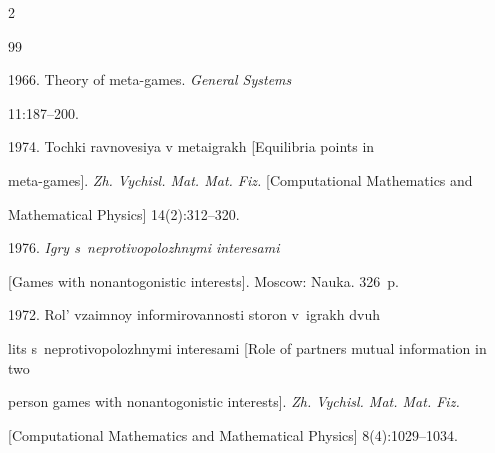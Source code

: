








  \begin{multicols}{2}



\renewcommand{\bibname}{\protect\rmfamily References}








{\small\frenchspacing

 {%


 \begin{thebibliography}{99}








 1966. Theory of meta-games. \textit{General Systems}

11:187--200.


 1974. Tochki ravnovesiya v metaigrakh [Equilibria points in

meta-games]. \textit{Zh. Vychisl. Mat. Mat. Fiz.} [Computational Mathematics and

Mathematical Physics] 14(2):312--320.


 1976. \textit{Igry s~neprotivopolozhnymi interesami}

[Games with nonantogonistic interests]. Moscow: Nauka. 326~p.


 1972. Rol' vzaimnoy informirovannosti storon v~igrakh dvuh

lits s~neprotivopolozhnymi interesami [Role of partners mutual information in two

person games with nonantogonistic interests]. \textit{Zh. Vychisl. Mat. Mat. Fiz.}

[Computational Mathematics and Mathematical Physics] 8(4):1029--1034.


\end{thebibliography}}}
\end{multicols}
